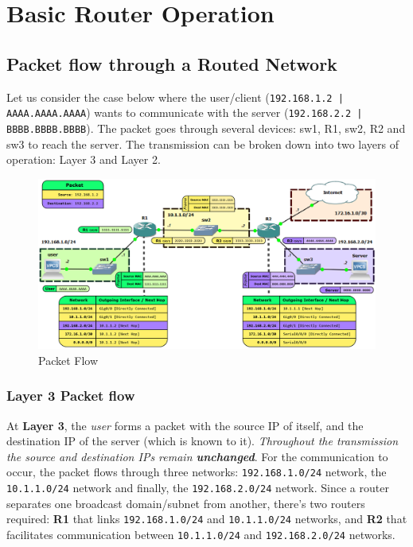 \chapter{Basic Router Operation}
\section{Packet flow through a Routed Network}
Let us consider the case below where the user/client (\verb~192.168.1.2 | AAAA.AAAA.AAAA~) wants to communicate with the server (\verb~192.168.2.2 | BBBB.BBBB.BBBB~). The packet goes through several devices: sw1, R1, sw2, R2 and sw3 to reach the server. The transmission can be broken down into two layers of operation: Layer 3 and Layer 2. 

\vspace{-5pt}
\begin{figure}[H]
\centering
\includegraphics[width=1\linewidth]{"ICND1/2. Routers/chapters/1.1.a. Packet Flow"}
\caption{Packet Flow}
\label{fig:7.1.a}
\end{figure}
\vspace{-10pt}

\subsection{Layer 3 Packet flow}
At \textbf{Layer 3}, the \textit{user} forms a packet with the source IP of itself, and the destination IP of the server (which is known to it). \textit{Throughout the transmission the source and destination IPs remain \textbf{unchanged}}. For the communication to occur, the packet flows through three networks: \verb|192.168.1.0/24| network, the \verb|10.1.1.0/24| network and finally, the \verb|192.168.2.0/24| network. Since a router separates one broadcast domain/subnet from another, there's two routers required: \textbf{R1} that links \verb|192.168.1.0/24| and \verb|10.1.1.0/24| networks, and \textbf{R2} that facilitates communication between \verb|10.1.1.0/24| and \verb|192.168.2.0/24| networks. 

